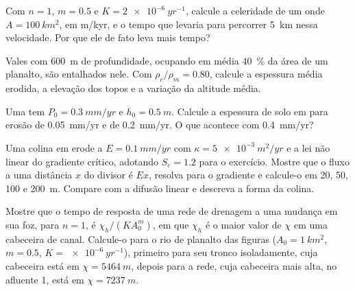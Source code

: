 \begin{exercise}[$\star\star$]\label{exo:b3:quantitative-geomorphology:7}
Com $n = 1$, $m = 0.5$ e $K = \qty{2e-6}{yr^{-1}}$, calcule a
celeridade de um  onde $A = \qty{100}{km^2}$, em m/kyr, e o
tempo que levaria para percorrer \qty{5}{km} nessa velocidade. Por que ele
de fato leva mais tempo?
\end{exercise}

\begin{exercise}[$\star\star$]\label{exo:b3:quantitative-geomorphology:8}
Vales com \qty{600}{m} de profundidade, ocupando em média \qty{40}{\percent} da
área de um planalto, são entalhados nele. Com $\rho_c/\rho_m = 0.80$, calcule
a espessura média erodida, a elevação dos topos e a variação da
altitude média.
\end{exercise}

\begin{exercise}[$\star\star$]\label{exo:b3:quantitative-geomorphology:9}
Uma  tem $P_0 = \qty{0.3}{mm/yr}$ e $h_0 =
\qty{0.5}{m}$. Calcule a espessura de solo em  para erosão de
\qty{0.05}{mm/yr} e de \qty{0.2}{mm/yr}. O que acontece com
\qty{0.4}{mm/yr}?
\end{exercise}

\begin{exercise}[$\star\star\star$]\label{exo:b3:quantitative-geomorphology:10}
Uma colina em  erode a $E = \qty{0.1}{mm/yr}$ com $\kappa =
\qty{5e-3}{m^2/yr}$ e a lei não linear do gradiente crítico, adotando
$S_c = 1.2$ para o exercício. Mostre que o fluxo a uma distância $x$ do
divisor é $E x$, resolva para o gradiente e calcule-o em 20, 50, 100 e
\qty{200}{m}. Compare com a difusão linear e descreva a forma da
colina.
\end{exercise}

\begin{exercise}[$\star\star\star$]\label{exo:b3:quantitative-geomorphology:11}
Mostre que o tempo de resposta de uma rede de drenagem a uma mudança em sua foz,
para $n = 1$, é $\chi_h/(K A_0^m)$, em que $\chi_h$ é o maior valor de
$\chi$ em uma cabeceira de canal. Calcule-o para o rio de planalto das figuras
($A_0 = \qty{1}{km^2}$, $m = 0.5$, $K = \qty{e-6}{yr^{-1}}$), primeiro para seu
tronco isoladamente, cuja cabeceira está em $\chi = \qty{5464}{m}$, depois para a rede,
cuja cabeceira mais alta, no afluente 1, está em $\chi = \qty{7237}{m}$.
\end{exercise}

